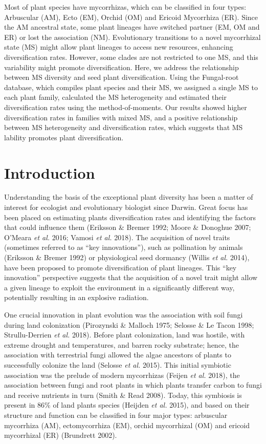 \documentclass[12pt,]{article}
\begin{document}
Most of plant species have mycorrhizas, which can be classified in four
types: Arbuscular (AM), Ecto (EM), Orchid (OM) and Ericoid Mycorrhiza
(ER). Since the AM ancestral state, some plant lineages have switched
partner (EM, OM and ER) or lost the association (NM). Evolutionary
transitions to a novel mycorrhizal state (MS) might allow plant lineages
to access new resources, enhancing diversification rates. However, some
clades are not restricted to one MS, and this variability might promote
diversification. Here, we address the relationship between MS diversity
and seed plant diversification. Using the Fungal-root database, which
compiles plant species and their MS, we assigned a single MS to each
plant family, calculated the MS heterogeneity and estimated their
diversification rates using the method-of-moments. Our results showed
higher diversification rates in families with mixed MS, and a positive
relationship between MS heterogeneity and diversification rates, which
suggests that MS lability promotes plant diversification.

\hypertarget{introduction}{%
\section{Introduction}\label{introduction}}

Understanding the basis of the exceptional plant diversity has been a
matter of interest for ecologist and evolutionary biologist since
Darwin. Great focus has been placed on estimating plants diversification
rates and identifying the factors that could influence them (Eriksson \&
Bremer 1992; Moore \& Donoghue 2007; O'Meara \emph{et al.} 2016; Vamosi
\emph{et al.} 2018). The acquisition of novel traits (sometimes referred
to as ``key innovations''), such as pollination by animals (Eriksson \&
Bremer 1992) or physiological seed dormancy (Willis \emph{et al.} 2014),
have been proposed to promote diversification of plant lineages. This
``key innovation'' perspective suggests that the acquisition of a novel
trait might allow a given lineage to exploit the environment in a
significantly different way, potentially resulting in an explosive
radiation.

One crucial innovation in plant evolution was the association with soil
fungi during land colonization (Pirozynski \& Malloch 1975; Selosse \&
Le Tacon 1998; Strullu-Derrien \emph{et al.} 2018). Before plant
colonization, land was hostile, with extreme drought and temperatures,
and barren rocky substrate; hence, the association with terrestrial
fungi allowed the algae ancestors of plants to successfully colonize the
land (Selosse \emph{et al.} 2015). This initial symbiotic association
was the prelude of modern mycorrhizas (Feijen \emph{et al.} 2018), the
association between fungi and root plants in which plants transfer
carbon to fungi and receive nutrients in turn (Smith \& Read 2008).
Today, this symbiosis is present in 86\% of land plants species (Heijden
\emph{et al.} 2015), and based on their structure and function can be
classified in four major types: arbuscular mycorrhiza (AM),
ectomycorrhiza (EM), orchid mycorrhizal (OM) and ericoid mycorrhizal
(ER) (Brundrett 2002).
\end{document}
